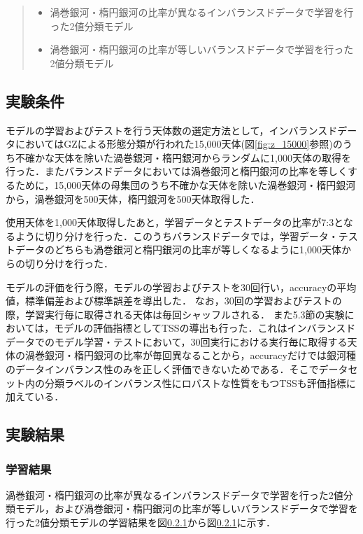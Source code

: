 \documentclass[a4j, 11pt]{jreport}
\begin{document}
\begin{quote}
 \begin{itemize}
	\item 渦巻銀河・楕円銀河の比率が異なるインバランスドデータで学習を行った2値分類モデル
	\item 渦巻銀河・楕円銀河の比率が等しいバランスドデータで学習を行った2値分類モデル
 \end{itemize}
\end{quote}

\subsection{実験条件}
モデルの学習およびテストを行う天体数の選定方法として，インバランスドデータにおいてはGZによる形態分類が行われた15,000天体(図\ref{fig:z_15000}参照)のうち不確かな天体を除いた渦巻銀河・楕円銀河からランダムに1,000天体の取得を行った．またバランスドデータにおいては渦巻銀河と楕円銀河の比率を等しくするために，15,000天体の母集団のうち不確かな天体を除いた渦巻銀河・楕円銀河から，渦巻銀河を500天体，楕円銀河を500天体取得した．

使用天体を1,000天体取得したあと，学習データとテストデータの比率が7:3となるように切り分けを行った．このうちバランスドデータでは，学習データ・テストデータのどちらも渦巻銀河と楕円銀河の比率が等しくなるように1,000天体からの切り分けを行った．

モデルの評価を行う際，モデルの学習およびテストを30回行い，accuracyの平均値，標準偏差および標準誤差を導出した．
なお，30回の学習およびテストの際，学習実行毎に取得される天体は毎回シャッフルされる．
また5.3節の実験においては，モデルの評価指標としてTSSの導出も行った．これはインバランスドデータでのモデル学習・テストにおいて，30回実行における実行毎に取得する天体の渦巻銀河・楕円銀河の比率が毎回異なることから，accuracyだけでは銀河種のデータインバランス性のみを正しく評価できないためである．そこでデータセット内の分類ラベルのインバランス性にロバストな性質をもつTSSも評価指標に加えている．

\subsection{実験結果}
\subsubsection{学習結果}
渦巻銀河・楕円銀河の比率が異なるインバランスドデータで学習を行った2値分類モデル，および渦巻銀河・楕円銀河の比率が等しいバランスドデータで学習を行った2値分類モデルの学習結果を図\ref{}から図\ref{}に示す．
\end{document}
